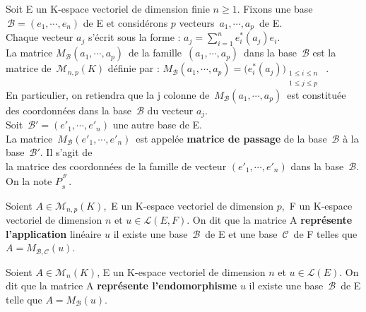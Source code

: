 \vspace{1.5cm}

Soit E un K-espace vectoriel de dimension finie \(n\geq 1\). Fixons une base \(\,\mathcal{B}=(e_1,\cdots,e_n)\) de E et considérons $p$ vecteurs \(\,a_1,\cdots,a_p\,\) de E.\vspace{-0.3cm}\\
Chaque vecteur $a_j$ s'écrit sous la forme : \(\displaystyle a_j=\sum_{i=1}^{n}e_i^*(a_j)e_i\).\\
La matrice \(M_\mathcal{B}(a_1,\cdots,a_p)\,\) de la famille \(\,(a_1,\cdots,a_p)\,\) dans la base \(\,\mathcal{B}\) est la matrice de \(\,\mathcal{M}_{n,p}(K)\) définie par : \(M_\mathcal{B}(a_1,\cdots,a_p)=\bigl(e_i^*(a_j)\bigr)_{\substack{1\leq i\leq n \\ 1\leq j\leq p}}\)\ .\vspace{0.15cm}\\
En particulier, on retiendra que la j colonne de \(\,M_\mathcal{B}(a_1,\cdots,a_p)\,\) est constituée des coordonnées dans la base \(\, \mathcal{B}\) du vecteur $a_j$.\vspace{1.2cm}\\
Soit \(\,\mathcal{B}'=(e'_1,\cdots,e'_n)\) une autre base de E.\vspace{0.1cm}\\
La matrice \(\,M_\mathcal{B}(e'_1,\cdots,e'_n)\,\) est appelée \textbf{matrice de passage} de la base \(\,\mathcal{B}\) à la base \(\,\mathcal{B}'\). Il s'agit de\vspace{0.1cm}\\
la matrice des coordonnées de la famille de vecteur \((e'_1,\cdots,e'_n)\) dans la base \(\,\mathcal{B}\). On la note \(P_{_\mathcal{B}} ^{^{\,\mathcal{B}'}}\).

\vspace{1.2cm}

Soient \(A\in \mathcal{M}_{n,p}(K)\),\, E un K-espace vectoriel de dimension $p$,\, F un K-espace vectoriel de dimension $n$ et \(u\in \mathscr{L}(E,F)\). On dit que la matrice A \textbf{représente l'application} linéaire $u$ \ssi il existe une base \(\,\mathcal{B}\,\) de E et une base \(\,\mathcal{C}\,\) de F telles que \(A=M_{\mathcal{B},\mathcal{C}}(u)\).

\vspace{0.5cm}

Soient \(A\in \mathcal{M}_n(K)\), E un K-espace vectoriel de dimension $n$ et \(u\in \mathscr{L}(E)\). On dit que la matrice A \textbf{représente l'endomorphisme} $u$ \ssi il existe une base \(\,\mathcal{B}\,\) de E telle que \(A=M_\mathcal{B}(u)\).

